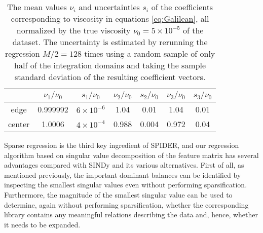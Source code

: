 \documentclass[preprint]{article}
\def\bi#1{\textbf{#1}}
\begin{document}
\begin{table}[b]
    \centering
    \begin{tabular}{c| c c| c c |c c}
            & $\nu_1/\nu_0$ & $s_1/\nu_0$ &   $\nu_2/\nu_0$ & $s_2/\nu_0$ & $\nu_3/\nu_0$ & $s_3/\nu_0$ \\ \hline
    edge   & 0.999992 & $6 \times 10^{-6}$& 1.04 & 0.01 & 1.04 & 0.01  \\
    center & 1.0006  & $4 \times 10^{-4}$ & 0.988 & 0.004 & 0.972 & 0.04  
    \end{tabular}
    \caption{The mean values $\nu_i$ and uncertainties $s_i$ of the coefficients corresponding to viscosity in equations \eqref{eq:Galilean}, all normalized by the true viscosity $\nu_0 = 5 \times 10^{-5}$ of the dataset. The uncertainty is estimated by rerunning the regression $M/2=128$ times using a random sample of only half of the integration domains and taking the sample standard deviation of the resulting coefficient vectors.}
    \label{tab:viscosity_coeffs}
\end{table}


Sparse regression is the third key ingredient of SPIDER, and our regression algorithm based on singular value decomposition of the feature matrix has several advantages compared with SINDy and its various alternatives. First of all, as mentioned previously, the important dominant balances can be identified by inspecting the smallest singular values even without performing sparsification. Furthermore, the magnitude of the smallest singular value can be used to determine, again without performing sparsification, whether the corresponding library contains any meaningful relations describing the data and, hence, whether it needs to be expanded.
\end{document}
